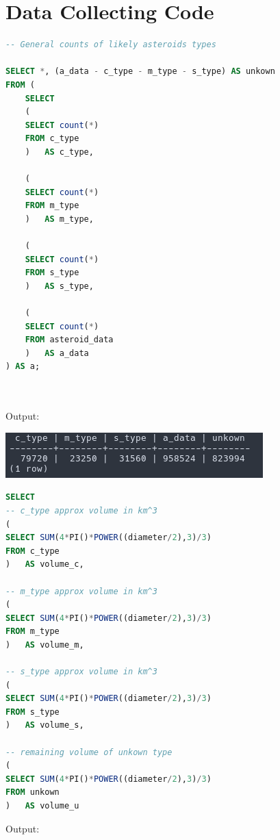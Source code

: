 \documentclass[12pt]{report}
\begin{document}
\newpage
\section*{Data Collecting Code}

\begin{lstlisting}[language=sql, deletekeywords={IDENTITY},
	deletekeywords={[2]INT},
	morekeywords={clustered},
	framesep=8pt,
	xleftmargin=40pt,
	framexleftmargin=40pt,
	frame=tb,
	framerule=0pt]
-- General counts of likely asteroids types

SELECT *, (a_data - c_type - m_type - s_type) AS unkown 
FROM (
	SELECT 
	(
	SELECT count(*)
	FROM c_type
	)   AS c_type,
	
	(
	SELECT count(*) 
	FROM m_type
	)   AS m_type,
	
	(
	SELECT count(*)
	FROM s_type
	)   AS s_type,
	
	(
	SELECT count(*)
	FROM asteroid_data
	)   AS a_data
) AS a;

	
\end{lstlisting}

Output: 

\includegraphics{"charts/q1.png"}

\newpage
\begin{lstlisting}[language=sql, deletekeywords={IDENTITY},
	deletekeywords={[2]INT},
	morekeywords={clustered},
	framesep=8pt,
	xleftmargin=40pt,
	framexleftmargin=40pt,
	frame=tb,
	framerule=0pt]
SELECT 
-- c_type approx volume in km^3
(
SELECT SUM(4*PI()*POWER((diameter/2),3)/3)
FROM c_type
)   AS volume_c,

-- m_type approx volume in km^3
(   
SELECT SUM(4*PI()*POWER((diameter/2),3)/3)
FROM m_type
)   AS volume_m,

-- s_type approx volume in km^3
(
SELECT SUM(4*PI()*POWER((diameter/2),3)/3)
FROM s_type
)   AS volume_s,

-- remaining volume of unkown type
(        
SELECT SUM(4*PI()*POWER((diameter/2),3)/3)
FROM unkown
)   AS volume_u
\end{lstlisting}

Output: 
\end{document}

